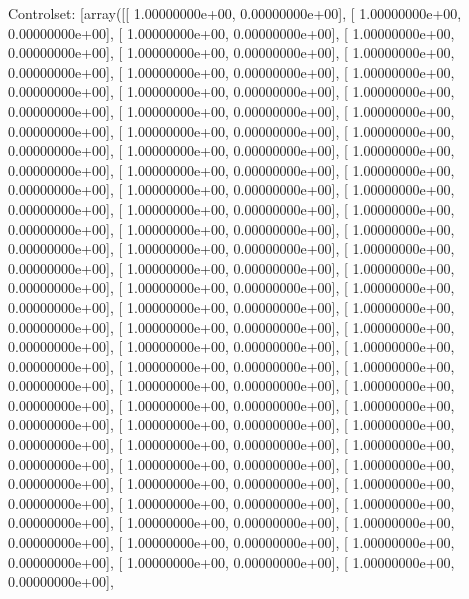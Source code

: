 \documentclass{article}
\begin{document}
Controlset: [array([[  1.00000000e+00,   0.00000000e+00],
       [  1.00000000e+00,   0.00000000e+00],
       [  1.00000000e+00,   0.00000000e+00],
       [  1.00000000e+00,   0.00000000e+00],
       [  1.00000000e+00,   0.00000000e+00],
       [  1.00000000e+00,   0.00000000e+00],
       [  1.00000000e+00,   0.00000000e+00],
       [  1.00000000e+00,   0.00000000e+00],
       [  1.00000000e+00,   0.00000000e+00],
       [  1.00000000e+00,   0.00000000e+00],
       [  1.00000000e+00,   0.00000000e+00],
       [  1.00000000e+00,   0.00000000e+00],
       [  1.00000000e+00,   0.00000000e+00],
       [  1.00000000e+00,   0.00000000e+00],
       [  1.00000000e+00,   0.00000000e+00],
       [  1.00000000e+00,   0.00000000e+00],
       [  1.00000000e+00,   0.00000000e+00],
       [  1.00000000e+00,   0.00000000e+00],
       [  1.00000000e+00,   0.00000000e+00],
       [  1.00000000e+00,   0.00000000e+00],
       [  1.00000000e+00,   0.00000000e+00],
       [  1.00000000e+00,   0.00000000e+00],
       [  1.00000000e+00,   0.00000000e+00],
       [  1.00000000e+00,   0.00000000e+00],
       [  1.00000000e+00,   0.00000000e+00],
       [  1.00000000e+00,   0.00000000e+00],
       [  1.00000000e+00,   0.00000000e+00],
       [  1.00000000e+00,   0.00000000e+00],
       [  1.00000000e+00,   0.00000000e+00],
       [  1.00000000e+00,   0.00000000e+00],
       [  1.00000000e+00,   0.00000000e+00],
       [  1.00000000e+00,   0.00000000e+00],
       [  1.00000000e+00,   0.00000000e+00],
       [  1.00000000e+00,   0.00000000e+00],
       [  1.00000000e+00,   0.00000000e+00],
       [  1.00000000e+00,   0.00000000e+00],
       [  1.00000000e+00,   0.00000000e+00],
       [  1.00000000e+00,   0.00000000e+00],
       [  1.00000000e+00,   0.00000000e+00],
       [  1.00000000e+00,   0.00000000e+00],
       [  1.00000000e+00,   0.00000000e+00],
       [  1.00000000e+00,   0.00000000e+00],
       [  1.00000000e+00,   0.00000000e+00],
       [  1.00000000e+00,   0.00000000e+00],
       [  1.00000000e+00,   0.00000000e+00],
       [  1.00000000e+00,   0.00000000e+00],
       [  1.00000000e+00,   0.00000000e+00],
       [  1.00000000e+00,   0.00000000e+00],
       [  1.00000000e+00,   0.00000000e+00],
       [  1.00000000e+00,   0.00000000e+00],
       [  1.00000000e+00,   0.00000000e+00],
       [  1.00000000e+00,   0.00000000e+00],
       [  1.00000000e+00,   0.00000000e+00],
       [  1.00000000e+00,   0.00000000e+00],
       [  1.00000000e+00,   0.00000000e+00],
       [  1.00000000e+00,   0.00000000e+00],
       [  1.00000000e+00,   0.00000000e+00],
       [  1.00000000e+00,   0.00000000e+00],
\end{document}
